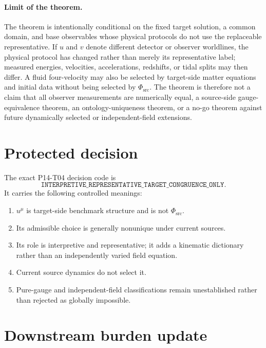 \documentclass[11pt]{article}
\newcommand{\PhiSrc}{\Phi_{\mathrm{src}}}
\begin{document}
\paragraph{Limit of the theorem.}
The theorem is intentionally conditional on the fixed target solution, a
common domain, and base observables whose physical protocols do not use the
replaceable representative.  If $u$ and $v$ denote different detector or
observer worldlines, the physical protocol has changed rather than merely its
representative label; measured energies, velocities, accelerations,
redshifts, or tidal splits may then differ.  A fluid four-velocity may also be
selected by target-side matter equations and initial data without being
selected by $\PhiSrc$.  The theorem is therefore not a claim that all observer
measurements are numerically equal, a source-side gauge-equivalence theorem,
an ontology-uniqueness theorem, or a no-go theorem against future dynamically
selected or independent-field extensions.

\section{Protected decision}

The exact P14-T04 decision code is
\[
\texttt{INTERPRETIVE\_REPRESENTATIVE\_TARGET\_CONGRUENCE\_ONLY}.
\]
It carries the following controlled meanings:
\begin{enumerate}
  \item $u^\mu$ is target-side benchmark structure and is not $\PhiSrc$.
  \item Its admissible choice is generally nonunique under current sources.
  \item Its role is interpretive and representative; it adds a kinematic
  dictionary rather than an independently varied field equation.
  \item Current source dynamics do not select it.
  \item Pure-gauge and independent-field classifications remain unestablished
  rather than rejected as globally impossible.
\end{enumerate}

\section{Downstream burden update}
\end{document}
